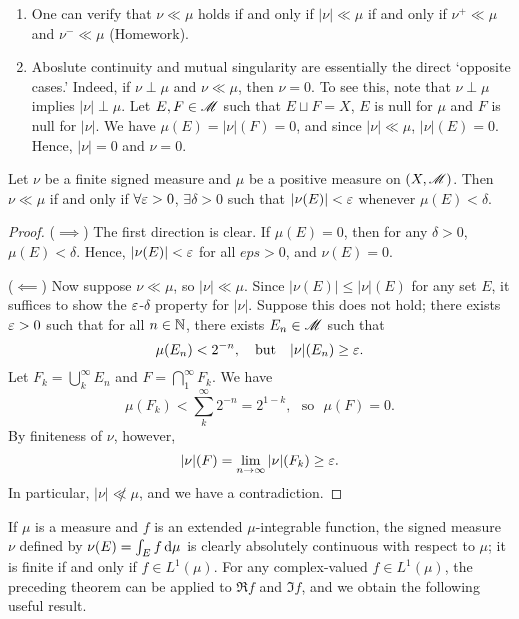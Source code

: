 \documentclass[12pt]{article} %
\begin{document}
\begin{remark}
    \begin{enumerate}
        \item One can verify that $\nu \ll \mu$ holds if and only if $|\nu| \ll \mu$ if and only if $\nu^+ \ll \mu$ and $\nu^- \ll \mu$ (Homework).
        \item Aboslute continuity and mutual singularity are essentially the direct `opposite cases.' Indeed, if $\nu \perp \mu$ and $\nu \ll \mu$, then $\nu = 0$. 
        To see this, note that $\nu \perp \mu$ implies $|\nu| \perp \mu$. Let $E, F \in \mathscr{M}$ such that $E \sqcup F = X$, $E$ is null for $\mu$ and $F$ is null for $|\nu|$. We have $\mu(E) = |\nu|(F) = 0$, and since $|\nu| \ll \mu$, $|\nu|(E) = 0$. Hence, $|\nu| = 0$ and $\nu = 0$.
    \end{enumerate}
\end{remark}

\begin{theorem}
    Let $\nu$ be a finite signed measure and $\mu$ be a positive measure on $(X, \mathscr{M})$. Then $\nu \ll \mu$ if and only if $\forall \varepsilon > 0$, $\exists \delta > 0$ such that $|\nu(E)| < \varepsilon$ whenever $\mu(E) < \delta$.
\end{theorem}

\begin{proof}
    ($\implies$) The first direction is clear. If $\mu(E) = 0$, then for any $\delta > 0$, $\mu(E) < \delta$. Hence, $|\nu(E)| < \varepsilon$ for all $eps > 0$, and $\nu(E) = 0$.

    ($\impliedby$) Now suppose $\nu \ll \mu$, so $|\nu| \ll \mu$. Since $|\nu(E)| \leq |\nu|(E)$ for any set $E$, it suffices to show the $\varepsilon$-$\delta$ property for $|\nu|$. Suppose this does not hold; there exists $\varepsilon > 0$ such that for all $n \in \mathbb{N}$, there exists $E_n \in \mathscr{M}$ such that \[\mu(E_n) < 2^{-n}, \ \ \ \text{but} \ \ \ |\nu|(E_n) \geq \eps.\] Let $F_k = \bigcup_k^\infty E_n$ and $F = \bigcap_1^\infty F_k$. We have \[\mu(F_k) < \sum_k^\infty 2^{-n} = 2^{1-k}, \ \ \ \text{so} \ \ \ \mu(F) = 0.\] By finiteness of $\nu$, however, \[|\nu|(F) = \lim_{n \to \infty} |\nu|(F_k) \geq \varepsilon.\] In particular, $|\nu| \not\ll \mu$, and we have a contradiction.
\end{proof}

If $\mu$ is a measure and $f$ is an extended $\mu$-integrable function, the signed measure $\nu$ defined by $\nu(E) = \int_E f \, \mathrm{d} \mu$ is clearly absolutely continuous with respect to $\mu$; it is finite if and only if $f \in L^1(\mu)$. For any complex-valued $f \in L^1(\mu)$, the preceding theorem can be applied to $\Re f$ and $\Im f$, and we obtain the following useful result.
\end{document}

